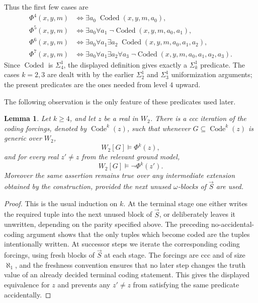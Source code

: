 \documentclass[a4paper,11pt]{article}
\newtheorem{lemma}[theorem]{Lemma}
\begin{document}
Thus the first few cases are
\begin{align*}
\Phi^4(x,y,m) &\Longleftrightarrow \exists a_0\; \operatorname{Coded}(x,y,m,a_0),\\
\Phi^5(x,y,m) &\Longleftrightarrow \exists a_0\forall a_1\; \neg\operatorname{Coded}(x,y,m,a_0,a_1),\\
\Phi^6(x,y,m) &\Longleftrightarrow \exists a_0\forall a_1\exists a_2\; \operatorname{Coded}(x,y,m,a_0,a_1,a_2),\\
\Phi^7(x,y,m) &\Longleftrightarrow \exists a_0\forall a_1\exists a_2\forall a_3\;
\neg\operatorname{Coded}(x,y,m,a_0,a_1,a_2,a_3).
\end{align*}
Since $\operatorname{Coded}$ is $\Sigma^1_4$, the displayed definition gives exactly a $\Sigma^1_k$ predicate.  The cases $k=2,3$ are dealt with by the earlier $\Sigma^1_2$ and $\Sigma^1_3$ uniformization arguments; the present predicates are the ones needed from level $4$ upward.

The following observation is the only feature of these predicates used later.

\begin{lemma}\label{lemma:higher-coding-predicates}
Let $k\geq 4$, and let $z$ be a real in $W_2$.  There is a ccc iteration of the coding forcings, denoted by $\operatorname{Code}^k(z)$, such that whenever $G\subseteq\operatorname{Code}^k(z)$ is generic over $W_2$,
\[
W_2[G]\models \Phi^k(z),
\]
and for every real $z'\neq z$ from the relevant ground model,
\[
W_2[G]\models \neg\Phi^k(z').
\]
Moreover the same assertion remains true over any intermediate extension obtained by the construction, provided the next unused $\omega$-blocks of $\vec S$ are used.
\end{lemma}

\begin{proof}
This is the usual induction on $k$.  At the terminal stage one either writes the required tuple into the next unused block of $\vec S$, or deliberately leaves it unwritten, depending on the parity specified above.  The preceding no-accidental-coding argument shows that the only tuples which become coded are the tuples intentionally written.  At successor steps we iterate the corresponding coding forcings, using fresh blocks of $\vec S$ at each stage.  The forcings are ccc and of size $\aleph_1$, and the freshness convention ensures that no later step changes the truth value of an already decided terminal coding statement.  This gives the displayed equivalence for $z$ and prevents any $z'\neq z$ from satisfying the same predicate accidentally.
\end{proof}
\end{document}

